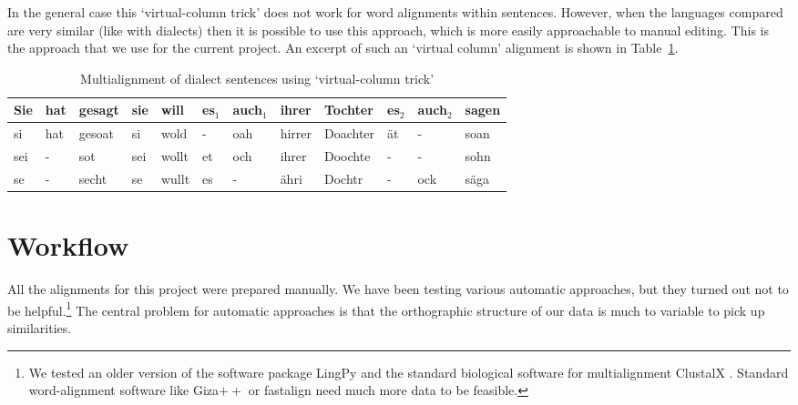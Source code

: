\documentclass[11pt]{article}
\begin{document}
In the general case this `virtual-column trick' does not work for word alignments within sentences. However, when the languages compared are very similar (like with dialects) then it is possible to use this approach, which is more easily approachable to manual editing. This is the approach that we use for the current project. An excerpt of such an `virtual column' alignment is shown in Table~\ref{tab:wenker_example}.

\begin{table}[htbp]
  \small
  \centering
  \begin{tabular}{llllllllllll} 
	\hline
	Sie & hat & gesagt & sie & will & es$_1$ & auch$_1$ & ihrer & Tochter & es$_2$ & auch$_2$ & sagen \\
	\hline
	si & hat & gesoat & si & wold & - & oah & hirrer & Doachter & ät & - & soan \\
    sei & - & sot & sei & wollt & et & och & ihrer & Doochte & - & - & sohn \\
    se & - & secht & se & wullt & es & - & ähri & Dochtr & - & ock & säga \\
    \hline
  \end{tabular}
  \caption{Multialignment of dialect sentences using `virtual-column trick'}
  \label{tab:wenker_example}
\end{table}

\section{Workflow}

All the alignments for this project were prepared manually. We have been testing various automatic approaches, but they turned out not to be helpful.\footnote{We tested an older version of the software package LingPy \parencite{list2017lingpy} and the standard biological software for multialignment ClustalX \parencite{Larkin2007}. Standard word-alignment software like Giza$++$ \parencite{och2003} or fastalign \parencite{dyer2013} need much more data to be feasible.} The central problem for automatic approaches is that the orthographic structure of our data is much to variable to pick up similarities. 

\printbibliography
\end{document}
